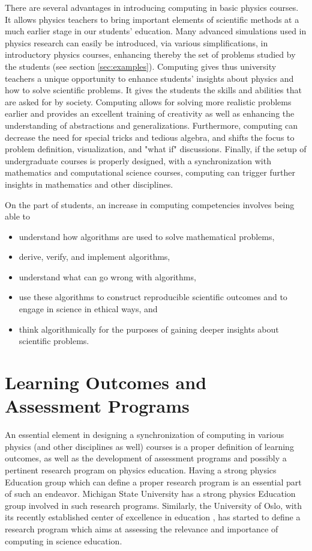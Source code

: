 \documentclass[graybox,envcountchap,sectrefs]{svmult}
\begin{document}
There are several advantages in  introducing computing in basic physics
courses. It allows physics teachers to bring important elements of
scientific methods at a much earlier stage in our students'
education. Many advanced simulations used in physics research can
easily be introduced, via various simplifications, in introductory
physics courses, enhancing thereby the set of problems studied by the
students (see section \ref{sec:examples}). Computing gives thus university
teachers a unique opportunity to enhance students' insights about
physics and how to solve scientific problems. It gives the
students the skills and abilities that are asked for by
society. Computing allows for solving more realistic problems earlier
and provides an excellent training of creativity as well as enhancing the
understanding of abstractions and generalizations. Furthermore,
computing can decrease the need for special tricks and tedious
algebra, and shifts the focus to problem definition, visualization,
and "what if" discussions. Finally, if the setup of undergraduate
courses is properly designed, with a synchronization with mathematics
and computational science courses, computing can trigger further
insights in mathematics and other disciplines.

On the part of students, an increase in computing competencies involves being able to
\begin{itemize}
\item understand how algorithms are used to solve mathematical problems,

\item derive, verify, and implement algorithms,

\item understand what can go wrong with algorithms,

\item use these algorithms to construct reproducible scientific outcomes and to engage in science in ethical ways, and

\item think algorithmically for the purposes of gaining deeper insights about scientific problems.
\end{itemize}


\section{Learning Outcomes and Assessment Programs}\label{sec:learingoutcomes}

An essential element in designing a synchronization of computing in
various physics (and other disciplines as well) courses is a proper
definition of learning outcomes, as well as the development of
assessment programs and possibly a pertinent research program on physics education.
Having a strong physics Education
group which can define a proper research program is an essential part
of such an endeavor. Michigan State University has a strong physics
Education group involved in such research programs. Similarly, the
University of Oslo, with its recently established center of excellence
in education \cite{CCSEUiO}, has started to define  a research program  which aims at assessing
the relevance and importance of
computing in science education.
\end{document}

